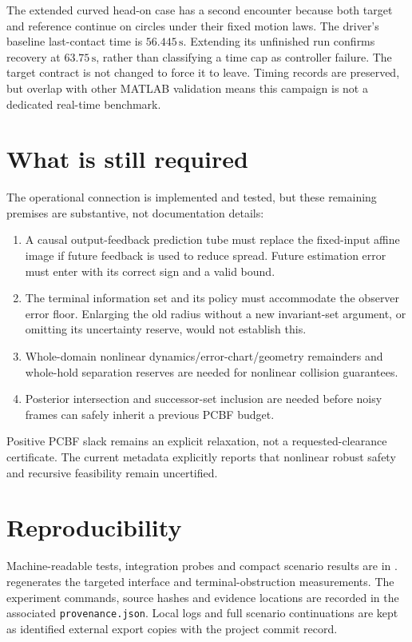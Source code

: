 \documentclass[11pt]{article}
\begin{document}
The extended curved head-on case has a second encounter because both target
and reference continue on circles under their fixed motion laws. The driver's
baseline last-contact time is $56.445\,\mathrm s$. Extending its unfinished
run confirms recovery at $63.75\,\mathrm s$, rather than classifying a time
cap as controller failure. The target contract is not changed to force it to
leave. Timing records are preserved, but overlap with other MATLAB validation
means this campaign is not a dedicated real-time benchmark.

\section{What is still required}
The operational connection is implemented and tested, but these remaining
premises are substantive, not documentation details:
\begin{enumerate}
 \item A causal output-feedback prediction tube must replace the fixed-input
 affine image if future feedback is used to reduce spread. Future estimation
 error must enter with its correct sign and a valid bound.
 \item The terminal information set and its policy must accommodate the
 observer error floor. Enlarging the old radius without a new invariant-set
 argument, or omitting its uncertainty reserve, would not establish this.
 \item Whole-domain nonlinear dynamics/error-chart/geometry remainders and
 whole-hold separation reserves are needed for nonlinear collision guarantees.
 \item Posterior intersection and successor-set inclusion are needed before
 noisy frames can safely inherit a previous PCBF budget.
\end{enumerate}
Positive PCBF slack remains an explicit relaxation, not a requested-clearance
certificate. The current metadata explicitly reports that nonlinear robust
safety and recursive feasibility remain uncertified.

\section{Reproducibility}
Machine-readable tests, integration probes and compact scenario results are
in .
 regenerates the targeted
interface and terminal-obstruction measurements. The experiment commands,
source hashes and evidence locations are recorded in the associated
\texttt{provenance.json}. Local logs and full scenario continuations are kept
as identified external export copies with the project commit record.
\end{document}
